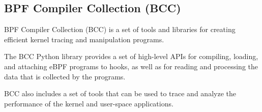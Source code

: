 



 \todo{}

 \todo{}



\subsection{BPF Compiler Collection (BCC)}
BPF Compiler Collection (BCC) is a set of tools and libraries for creating efficient kernel tracing and manipulation programs. 

The BCC Python library provides a set of high-level APIs for compiling, loading, and attaching eBPF programs to hooks, as well as for reading and processing the data that is collected by the programs.

BCC also includes a set of tools that can be used to trace and analyze the performance of the kernel and user-space applications. 
